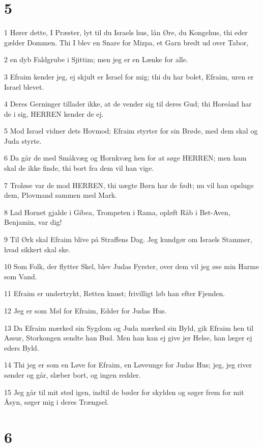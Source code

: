 \chapter{5}

\par 1 Hører dette, I Præster, lyt til du Israels hus, lån Øre, du Kongehus, thi eder gælder Dommen. Thi I blev en Snare for Mizpa, et Garn bredt ud over Tabor,
\par 2 en dyb Faldgrube i Sjittim; men jeg er en Lænke for alle.
\par 3 Efraim kender jeg, ej skjult er Israel for mig; thi du har bolet, Efraim, uren er Israel blevet.
\par 4 Deres Gerninger tillader ikke, at de vender sig til deres Gud; thi Horeånd har de i sig, HERREN kender de ej.
\par 5 Mod Israel vidner dets Hovmod; Efraim styrter for sin Brøde, med dem skal og Juda styrte.
\par 6 Da går de med Småkvæg og Hornkvæg hen for at søge HERREN; men ham skal de ikke finde, thi bort fra dem vil han vige.
\par 7 Troløse var de mod HERREN, thi uægte Børn har de født; nu vil han opsluge dem, Plovmand sammen med Mark.
\par 8 Lad Hornet gjalde i Gibea, Trompeten i Rama, opløft Råb i Bet-Aven, Benjamin, var dig!
\par 9 Til Ørk skal Efraim blive på Straffens Dag. Jeg kundgør om Israels Stammer, hvad sikkert skal ske.
\par 10 Som Folk, der flytter Skel, blev Judas Fyrster, over dem vil jeg øse min Harme som Vand.
\par 11 Efraim er undertrykt, Retten knust; frivilligt løb han efter Fjenden.
\par 12 Jeg er som Møl for Efraim, Edder for Judas Hus.
\par 13 Da Efraim mærked sin Sygdom og Juda mærked sin Byld, gik Efraim hen til Assur, Storkongen sendte han Bud. Men han kan ej give jer Helse, han læger ej eders Byld.
\par 14 Thi jeg er som en Løve for Efraim, en Løveunge for Judas Hus; jeg, jeg river sønder og går, slæber bort, og ingen redder.
\par 15 Jeg går til mit sted igen, indtil de bøder for skylden og søger frem for mit Åsyn, søger mig i deres Trængsel.

\chapter{6}

